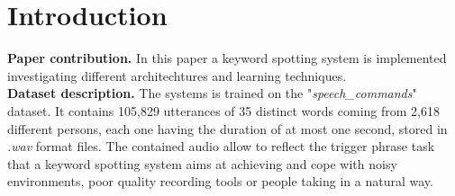
\section{Introduction}
\label{sec:introduction}

\noindent \textbf{Paper contribution.} In this paper a keyword spotting system is implemented investigating different architechtures and learning techniques. \\

\noindent \textbf{Dataset description.} \cite{Warden-2018} The systems is trained on the \mbox{"{\it speech\_commands}"} dataset. It contains 105,829 utterances of 35 distinct words coming from 2,618 different persons, each one having the duration of at most one second, stored in {\it .wav} format files. The contained audio allow to reflect the trigger phrase task that a keyword spotting system aims at achieving and cope with noisy environments, poor quality recording tools or people taking in a natural way. \\

